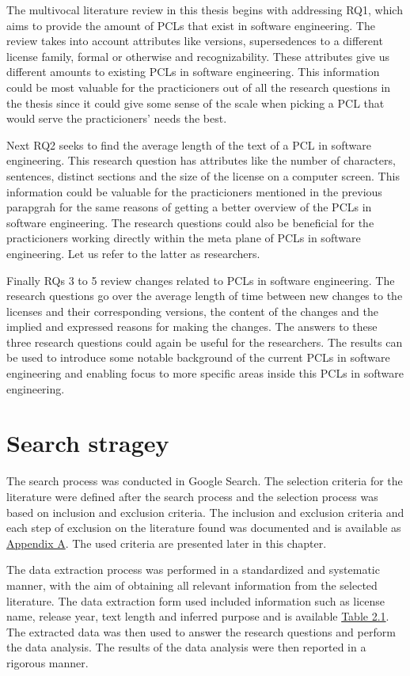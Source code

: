 The multivocal literature review in this thesis begins with addressing RQ1, which aims to provide the amount of PCLs that exist in software engineering. The review takes into account attributes like versions, supersedences to a different license family, formal or otherwise and recognizability. These attributes give us different amounts to existing PCLs in software engineering. This information could be most valuable for the practicioners out of all the research questions in the thesis since it could give some sense of the scale when picking a PCL that would serve the practicioners' needs the best.

Next RQ2 seeks to find the average length of the text of a PCL in software engineering. This research question has attributes like the number of characters, sentences, distinct sections and the size of the license on a computer screen. This information could be valuable for the practicioners mentioned in the previous parapgrah for the same reasons of getting a better overview of the PCLs in software engineering. The research questions could also be beneficial for the practicioners working directly within the meta plane of PCLs in software engineering. Let us refer to the latter as researchers.

Finally RQs 3 to 5 review changes related to PCLs in software engineering. The research questions go over the average length of time between new changes to the licenses and their corresponding versions, the content of the changes and the implied and expressed reasons for making the changes. The answers to these three research questions could again be useful for the researchers. The results can be used to introduce some notable background of the current PCLs in software engineering and enabling focus to more specific areas inside this PCLs in software engineering.

\section{Search stragey}
The search process was conducted in Google Search. The selection criteria for the literature were defined after the search process and the selection process was based on inclusion and exclusion criteria. The inclusion and exclusion criteria and each step of exclusion on the literature found was documented and is available as \hyperref[appendix:a]{Appendix A}. The used criteria are presented later in this chapter.

The data extraction process was performed in a standardized and systematic manner, with the aim of obtaining all relevant information from the selected literature. The data extraction form used included information such as license name, release year, text length and inferred purpose and is available  \hyperref[table:extraction]{Table 2.1}. The extracted data was then used to answer the research questions and perform the data analysis. The results of the data analysis were then reported in a rigorous manner.
